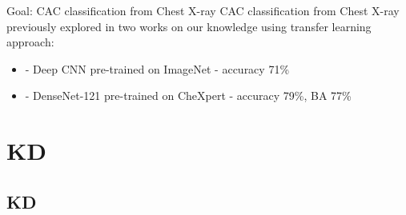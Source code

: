 \documentclass[compress,aspectratio=169,xcolor=table]{beamer}
\begin{document}
\begin{frame}{Goal: CAC classification from Chest X-ray}
	\bigskip
	CAC classification from Chest X-ray previously explored in two works on our knowledge using transfer learning approach:
	\begin{itemize}
		\item {} - Deep CNN pre-trained on ImageNet - accuracy 71\%
		\item {} - DenseNet-121 pre-trained on CheXpert - accuracy 79\%, BA 77\%
	\end{itemize}
\end{frame}


\section{KD}\subsection{KD}
\end{document}
